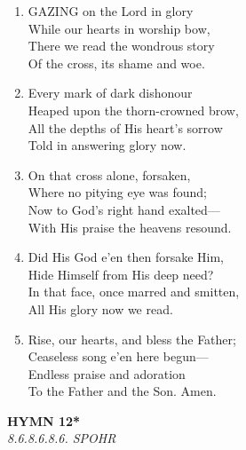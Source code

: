\documentclass[11pt,a4paper]{article}
\begin{document}
\begin{enumerate}
    \item GAZING on the Lord in glory \\
        While our hearts in worship bow, \\
        There we read the wondrous story \\
        Of the cross, its shame and woe.

    \item Every mark of dark dishonour \\
        Heaped upon the thorn-crowned brow, \\
        All the depths of His heart's sorrow \\
        Told in answering glory now.

    \item On that cross alone, forsaken, \\
        Where no pitying eye was found; \\
        Now to God's right hand exalted--- \\
        With His praise the heavens resound.

    \item Did His God e'en then forsake Him, \\
        Hide Himself from His deep need? \\
        In that face, once marred and smitten, \\
        All His glory now we read.

    \item Rise, our hearts, and bless the Father; \\
        Ceaseless song e'en here begun--- \\
        Endless praise and adoration \\
        To the Father and the Son. Amen.

\end{enumerate}

\newpage
\begin{center}
    {\Large \textbf{HYMN 12*}}
    \\
    \textit{8.6.8.6.8.6. SPOHR}
\end{center}
\vspace{1em}
\end{document}
